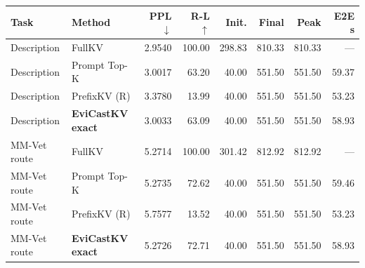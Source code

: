 \begin{tabular}{llrrrrrr}
\toprule
Task & Method & PPL $\downarrow$ & R-L $\uparrow$ & Init. & Final & Peak & E2E s\\\midrule
Description & FullKV & 2.9540 & 100.00 & 298.83 & 810.33 & 810.33 & ---\\
Description & Prompt Top-K & 3.0017 & 63.20 & 40.00 & 551.50 & 551.50 & 59.37\\
Description & PrefixKV (R) & 3.3780 & 13.99 & 40.00 & 551.50 & 551.50 & 53.23\\
Description & \textbf{EviCastKV exact} & 3.0033 & 63.09 & 40.00 & 551.50 & 551.50 & 58.93\\
MM-Vet route & FullKV & 5.2714 & 100.00 & 301.42 & 812.92 & 812.92 & ---\\
MM-Vet route & Prompt Top-K & 5.2735 & 72.62 & 40.00 & 551.50 & 551.50 & 59.46\\
MM-Vet route & PrefixKV (R) & 5.7577 & 13.52 & 40.00 & 551.50 & 551.50 & 53.23\\
MM-Vet route & \textbf{EviCastKV exact} & 5.2726 & 72.71 & 40.00 & 551.50 & 551.50 & 58.93\\
\bottomrule
\end{tabular}
